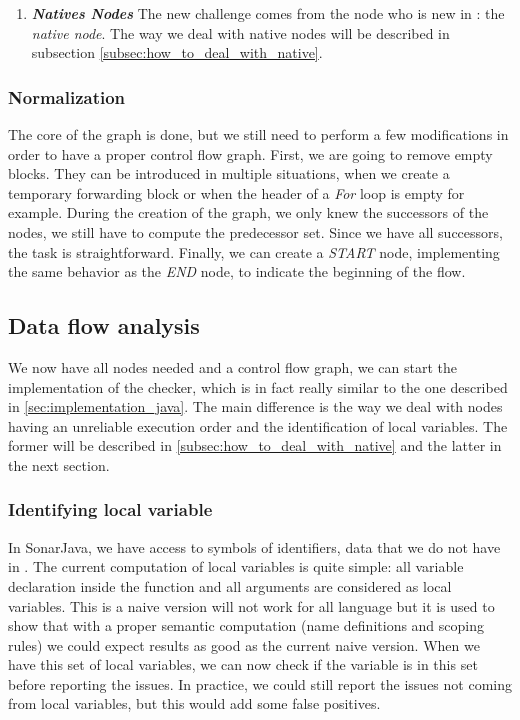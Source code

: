 \begin{enumerate}
	\item \textbf{\textit{Natives Nodes}} \newline 
	\label{subsubsec:native_nodes_cfg}
	The new challenge comes from the node who is new in \slang{}: the \emph{native node}. 
	The way we deal with native nodes will be described in subsection \ref{subsec:how_to_deal_with_native}.
\end{enumerate}

\subsubsection{Normalization}
\label{subsubsec:normalization_cfg}
The core of the graph is done, but we still need to perform a few modifications in order to have a proper control flow graph. 
First, we are going to remove empty blocks. 
They can be introduced in multiple situations, when we create a temporary forwarding block or when the header of a \emph{For} loop is empty for example.
During the creation of the graph, we only knew the successors of the nodes, we still have to compute the predecessor set. 
Since we have all successors, the task is straightforward. 
Finally, we can create a \emph{START} node, implementing the same behavior as the \emph{END} node, to indicate the beginning of the flow.

\subsection{Data flow analysis}
\label{subsec:data_flow_analysis}

We now have all nodes needed and a control flow graph, we can start the implementation of the checker, which is in fact really similar to the one described in \ref{sec:implementation_java}. 
The main difference is the way we deal with nodes having an unreliable execution order and the identification of local variables.
The former will be described in \ref{subsec:how_to_deal_with_native} and the latter in the next section.

\subsubsection{Identifying local variable}
\label{subsubsec:identifying_local_variable}

In SonarJava, we have access to symbols of identifiers, data that we do not have in \slang{}. 
The current computation of local variables is quite simple: all variable declaration inside the function and all arguments are considered as local variables.
This is a naive version will not work for all language but it is used to show that with a proper semantic computation (name definitions and scoping rules) we could expect results as good as the current naive version. \newline
When we have this set of local variables, we can now check if the variable is in this set before reporting the issues. 
In practice, we could still report the issues not coming from local variables, but this would add some false positives.

